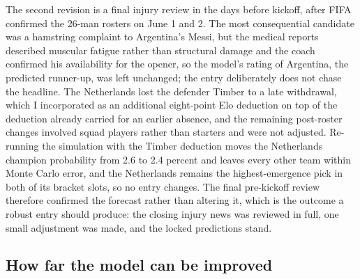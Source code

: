 \documentclass[11pt,a4paper]{article}
\begin{document}
The second revision is a final injury review in the days before kickoff, after FIFA confirmed the 26-man rosters on June 1 and 2. The most consequential candidate was a hamstring complaint to Argentina's Messi, but the medical reports described muscular fatigue rather than structural damage and the coach confirmed his availability for the opener, so the model's rating of Argentina, the predicted runner-up, was left unchanged; the entry deliberately does not chase the headline. The Netherlands lost the defender Timber to a late withdrawal, which I incorporated as an additional eight-point Elo deduction on top of the deduction already carried for an earlier absence, and the remaining post-roster changes involved squad players rather than starters and were not adjusted. Re-running the simulation with the Timber deduction moves the Netherlands champion probability from 2.6 to 2.4 percent and leaves every other team within Monte Carlo error, and the Netherlands remains the highest-emergence pick in both of its bracket slots, so no entry changes. The final pre-kickoff review therefore confirmed the forecast rather than altering it, which is the outcome a robust entry should produce: the closing injury news was reviewed in full, one small adjustment was made, and the locked predictions stand.

\subsection{How far the model can be improved}\label{sec:audit}
\end{document}
